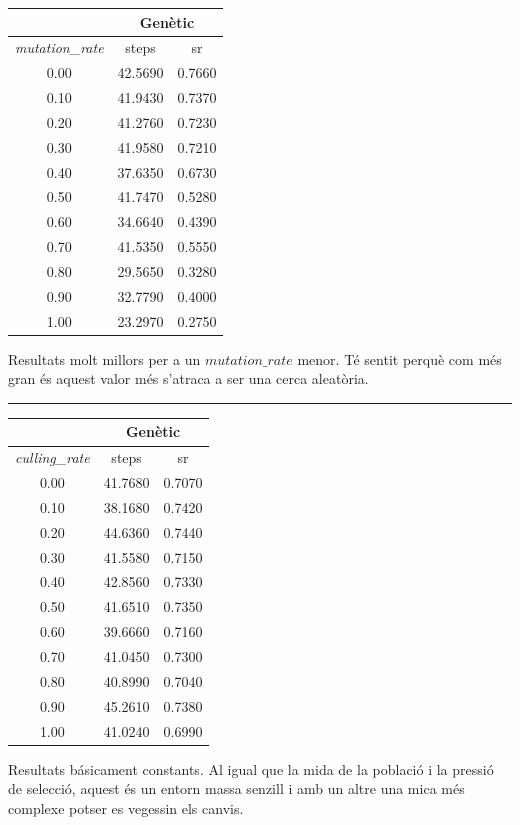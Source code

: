 \documentclass[12pt,a4paper]{report}
\begin{document}
\begin{minipage}{0.3\textwidth}
  \centering
  \begin{tabular}{| c | c c |}
    \hline
      & \multicolumn{2}{|c|}{Genètic} \\
    \hline
    \textit{mutation\_rate} & steps & sr \\
    \hline
    0.00 & 42.5690 & 0.7660 \\
    0.10 & 41.9430 & 0.7370 \\
    0.20 & 41.2760 & 0.7230 \\
    0.30 & 41.9580 & 0.7210 \\
    0.40 & 37.6350 & 0.6730 \\
    0.50 & 41.7470 & 0.5280 \\
    0.60 & 34.6640 & 0.4390 \\
    0.70 & 41.5350 & 0.5550 \\
    0.80 & 29.5650 & 0.3280 \\
    0.90 & 32.7790 & 0.4000 \\
    1.00 & 23.2970 & 0.2750 \\
    \hline
  \end{tabular}
\end{minipage}
\hfill
\begin{minipage}{0.5\textwidth}
  Resultats molt millors per a un $\mathit{mutation\_rate}$ menor. Té sentit perquè com més gran
  és aquest valor més s'atraca a ser una cerca aleatòria.
\end{minipage}

\vspace*{10pt}\hrule

\begin{minipage}{0.3\textwidth}
  \centering
  \begin{tabular}{| c | c c |}
    \hline
      & \multicolumn{2}{|c|}{Genètic} \\
    \hline
    \textit{culling\_rate} & steps & sr \\
    \hline
    0.00 & 41.7680 & 0.7070 \\
    0.10 & 38.1680 & 0.7420 \\
    0.20 & 44.6360 & 0.7440 \\
    0.30 & 41.5580 & 0.7150 \\
    0.40 & 42.8560 & 0.7330 \\
    0.50 & 41.6510 & 0.7350 \\
    0.60 & 39.6660 & 0.7160 \\
    0.70 & 41.0450 & 0.7300 \\
    0.80 & 40.8990 & 0.7040 \\
    0.90 & 45.2610 & 0.7380 \\
    1.00 & 41.0240 & 0.6990 \\
    \hline
  \end{tabular}
\end{minipage}
\hfill
\begin{minipage}{0.5\textwidth}
  Resultats básicament constants. Al igual que la mida de la població i la pressió de selecció, aquest és un
  entorn massa senzill i amb un altre una mica més complexe potser es vegessin els canvis.
\end{minipage}
\end{document}
